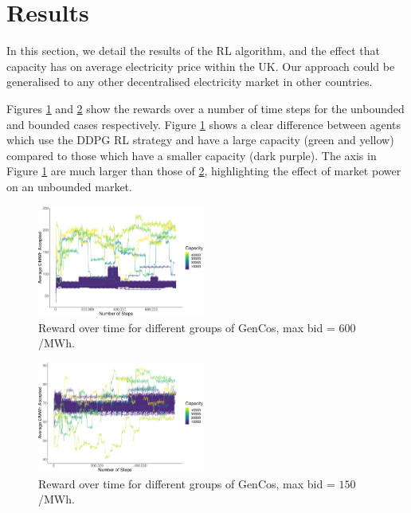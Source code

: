 \documentclass[conference]{IEEEtran}
\begin{document}
\section{Results}
\label{sec:results}

In this section, we detail the results of the RL algorithm, and the effect that capacity has on average electricity price within the UK. Our approach could be generalised to any other decentralised electricity market in other countries. 

Figures \ref{fig:unbounded_timesteps} and \ref{fig:bounded_timesteps} show the rewards over a number of time steps for the unbounded and bounded cases respectively. Figure \ref{fig:unbounded_timesteps} shows a clear difference between agents which use the DDPG RL strategy and have a large capacity (green and yellow) compared to those which have a smaller capacity (dark purple). The axis in Figure \ref{fig:unbounded_timesteps} are much larger than those of \ref{fig:bounded_timesteps}, highlighting the effect of market power on an unbounded market.


\begin{figure}
	\centering
    \includegraphics[width=0.49\textwidth]{figures/results/unbounded_results.pdf}
    \caption{Reward over time for different groups of GenCos, max bid = \textsterling $600$/MWh.}
    \label{fig:unbounded_timesteps}
\end{figure}

\begin{figure}
	\centering
    \includegraphics[width=0.49\textwidth]{figures/results/bounded_results.pdf}
    \caption{Reward over time for different groups of GenCos, max bid = \textsterling $150$/MWh.}
    \label{fig:bounded_timesteps}
\end{figure}
\end{document}
